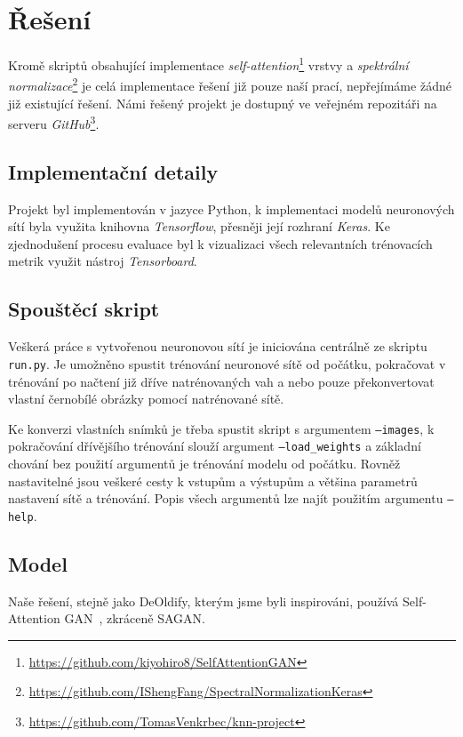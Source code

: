 \documentclass[12pt, a4paper]{article}
\begin{document}
    \section{Řešení}
    Kromě skriptů obsahující implementace \textit{self-attention}\footnote{\url{https://github.com/kiyohiro8/SelfAttentionGAN}} vrstvy a \textit{spektrální normalizace}\footnote{\url{https://github.com/IShengFang/SpectralNormalizationKeras}} je celá implementace řešení již pouze naší prací, nepřejímáme žádné již existující řešení. Námi řešený projekt je dostupný ve veřejném repozitáři na serveru \textit{GitHub}\footnote{\url{https://github.com/TomasVenkrbec/knn-project}}.
    
    \subsection{Implementační detaily}
    Projekt byl implementován v jazyce Python, k implementaci modelů neuronových sítí byla využita knihovna \textit{Tensorflow}, přesněji její rozhraní \textit{Keras}. Ke zjednodušení procesu evaluace byl k vizualizaci všech relevantních trénovacích metrik využit nástroj \textit{Tensorboard}.
    
    \subsection{Spouštěcí skript}
    Veškerá práce s vytvořenou neuronovou sítí je iniciována centrálně ze skriptu \texttt{run.py}. Je umožněno spustit trénování neuronové sítě od počátku, pokračovat v trénování po načtení již dříve natrénovaných vah a nebo pouze překonvertovat vlastní černobílé obrázky pomocí natrénované sítě.
    
    Ke konverzi vlastních snímků je třeba spustit skript s argumentem \texttt{--images}, k pokračování dřívějšího trénování slouží argument \texttt{--load\_weights} a základní chování bez použití argumentů je trénování modelu od počátku. Rovněž nastavitelné jsou veškeré cesty k vstupům a výstupům a většina parametrů nastavení sítě a trénování. Popis všech argumentů lze najít použitím argumentu \texttt{--help}.
    
    \subsection{Model}
    Naše řešení, stejně jako DeOldify, kterým jsme byli inspirováni, používá Self-Attention GAN~\cite{sagan}, zkráceně SAGAN.
    
\end{document}
